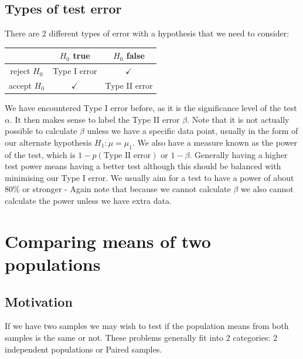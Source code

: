 \documentclass[12pt]{article}
\begin{document}
\subsection*{Types of test error}
There are 2 different types of error with a hypothesis that we need to consider:
\begin{table}[H]
    \begin{tabular}{c|c c}
         & \(H_0\) true & \(H_0\) false \\ \hline
         reject \(H_0\) & Type I error & \(\checkmark\) \\
         accept \(H_0\) & \(\checkmark\) & Type II error \\
    \end{tabular}
\end{table}
We have encountered Type I error before, as it is the significance level of the test \(\alpha\). It then makes sense to label the Type II error \(\beta\). Note that it is not actually possible to calculate \(\beta\) unless we have a specific data point, usually in the form of our alternate hypothesis \(H_1:\mu=\mu_1\). We also have a measure known as the power of the test, which is \(1-p(\text{Type II error})\) or \(1-\beta\). Generally having a higher test power means having a better test although this should be balanced with minimising our Type I error. We usually aim for a test to have a power of about 80\% or stronger - Again note that because we cannot calculate \(\beta\) we also cannot calculate the power unless we have extra data.
\section{Comparing means of two populations}
\subsection*{Motivation}
If we have two samples we may wish to test if the population means from both samples is the same or not. These problems generally fit into 2 categories: 2 independent populations or Paired samples.
\end{document}
